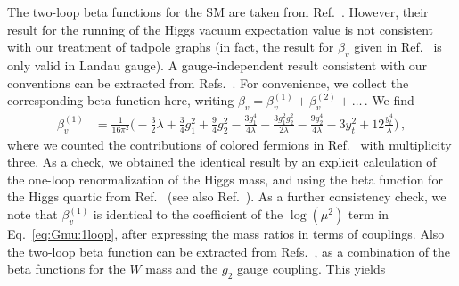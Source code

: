 \documentclass[letter,11pt,DIV=12,abstract=true,numbers=noenddot,titlepage=false,twocolumn=false,draft=false]{scrartcl}
\newcommand{\Blu}[1]{{\color{Blu}{#1}}}
\newcommand{\jb}[1]{\Blu{\bf [JB: #1]}}
\begin{document}
The two-loop beta functions for the SM are taken from
Ref.~\cite{Arason:1991ic}. However, their result for the running of
the Higgs vacuum expectation value is not consistent with our
treatment of tadpole graphs (in fact, the result for $\beta_v$ given
in Ref.~\cite{Arason:1991ic} is only valid in Landau gauge). A
gauge-independent result consistent with our conventions can be
extracted from Refs.~\cite{Jegerlehner:2001fb,
  Jegerlehner:2002em}. For convenience, we collect the corresponding
beta function here, writing $\beta_v = \beta_{v}^{(1)} +
\beta_{v}^{(2)} + \ldots\,$. We find
\begin{align}\label{eq:beta:v}
 \beta_{v}^{(1)} & = \frac{1}{16\pi^2}
               \bigg( - \frac{3}{2} \lambda
                      + \frac{3}{4} g_1^2
                      + \frac{9}{4} g_2^2
                      - \frac{3g_1^4}{4\lambda}
                      - \frac{3g_1^2g_2^2}{2\lambda}
                      - \frac{9g_2^4}{4\lambda}
                      - 3 y_t^2
                      + 12 \frac{y_t^4}{\lambda} \bigg) \,,
\end{align}
where we counted the contributions of colored fermions in
Ref.~\cite{Jegerlehner:2002em} with multiplicity three. As a check, we
obtained the identical result by an explicit calculation of the
one-loop renormalization of the Higgs mass, and using the beta
function for the Higgs quartic from Ref.~\cite{Arason:1991ic} (see
also Ref.~\cite{Brod:2020lhd}). As a further consistency check, we
note that $\beta_{v}^{(1)}$ is identical to the coefficient of the
$\log(\mu^2)$ term in Eq.~\eqref{eq:Gmu:1loop}, after expressing the
mass ratios in terms of couplings. Also the two-loop beta function can
be extracted from Refs.~\cite{Jegerlehner:2001fb, Jegerlehner:2002em},
as a combination of the beta functions for the $W$ mass and the $g_2$
gauge coupling. This yields
\end{document}
